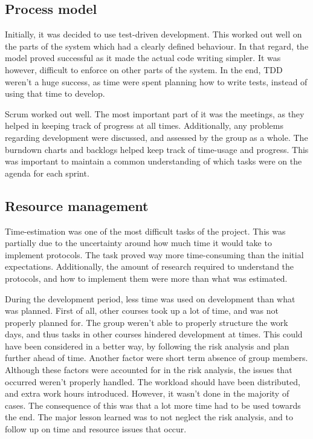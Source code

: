\subsection{Process model}
\label{subsec:project_evaluation-development-process_model}

Initially, it was decided to use test-driven development. This worked out well on the parts of the system which had a clearly defined behaviour. In that regard, the model proved successful as it made the actual code writing simpler. It was however, difficult to enforce on other parts of the system. In the end, TDD weren't a huge success, as time were spent planning how to write tests, instead of using that time to develop. 

Scrum worked out well. The most important part of it was the meetings, as they helped in keeping track of progress at all times. Additionally, any problems regarding development were discussed, and assessed by the group as a whole. The burndown charts and backlogs helped keep track of time-usage and progress. This was important to maintain a common understanding of which tasks were on the agenda for each sprint.

\subsection{Resource management}
\label{subsec:project_evaluation-development-time_management}

Time-estimation was one of the most difficult tasks of the project. This was partially due to the uncertainty around how much time it would take to implement protocols. The task proved way more time-consuming than the initial expectations. Additionally, the amount of research required to understand the protocols, and how to implement them were more than what was estimated.

During the development period, less time was used on development than what was planned. First of all, other courses took up a lot of time, and was not properly planned for. The group weren't able to properly structure the work days, and thus tasks in other courses hindered development at times. This could have been considered in a better way, by following the risk analysis and plan further ahead of time. Another factor were short term absence of group members. Although these factors were accounted for in the risk analysis, the issues that occurred weren't properly handled. The workload should have been distributed, and extra work hours introduced. However, it wasn't done in the majority of cases. The consequence of this was that a lot more time had to be used towards the end. The major lesson learned was to not neglect the risk analysis, and to follow up on time and resource issues that occur. 

